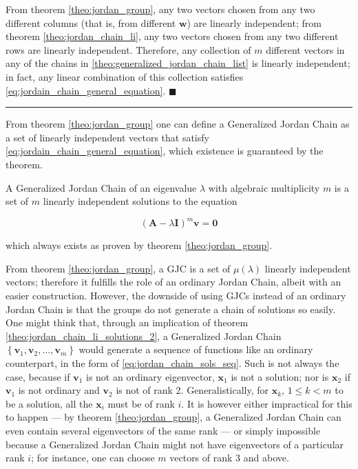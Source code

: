 	From theorem \ref{theo:jordan_group}, any two vectors chosen from any two different columns (that is, from different $\mathbf{w}$) are linearly independent; from theorem \ref{theo:jordan_chain_li}, any two vectors chosen from any two different rows are linearly independent. Therefore, any collection of $m$ different vectors in any of the chains in \eqref{theo:generalized_jordan_chain_list} is linearly independent; in fact, any linear combination of this collection satisfies \eqref{eq:jordain_chain_general_equation}.
\hfill$\blacksquare$
\vspace{5mm}
\hrule
\vspace{5mm} %

	From theorem \ref{theo:jordan_group} one can define a Generalized Jordan Chain as a set of linearly independent vectors that satisfy \eqref{eq:jordain_chain_general_equation}, which existence is guaranteed by the theorem.

\begin{definition}\label{def:jordan_group} %
	A Generalized Jordan Chain of an eigenvalue $\lambda$ with algebraic multiplicity $m$ is a set of $m$ linearly independent solutions to the equation

\begin{equation} \left(\mathbf{A} - \lambda\mathbf{I}\right)^m\mathbf{v} = \mathbf{0} \end{equation}

	\noindent which always exists as proven by theorem \ref{theo:jordan_group}.
\end{definition} %

	From theorem \ref{theo:jordan_group}, a GJC is a set of $\mu\left(\lambda\right)$ linearly independent vectors; therefore it fulfills the role of an ordinary Jordan Chain, albeit with an easier construction. However, the downside of using GJCs instead of an ordinary Jordan Chain is that the groups do not generate a chain of solutions so easily. One might think that, through an implication of theorem \ref{theo:jordan_chain_li_solutions_2}, a Generalized Jordan Chain $\left\{\mathbf{v}_1,\mathbf{v}_2,...,\mathbf{v}_m\right\}$ would generate a sequence of functions like an ordinary counterpart, in the form of \eqref{eq:jordan_chain_sols_seq}. Such is not always the case, because if $\mathbf{v}_1$ is not an ordinary eigenvector, $\mathbf{x}_1$ is not a solution; nor is $\mathbf{x}_2$ if $\mathbf{v}_1$ is not ordinary and $\mathbf{v}_2$ is not of rank 2. Generalistically, for $\mathbf{x}_k$, $1\leq k < m$ to be a solution, all the $\mathbf{x}_i$ must be of rank $i$. It is however either impractical for this to happen — by theorem \ref{theo:jordan_group}, a Generalized Jordan Chain can even contain several eigenvectors of the same rank — or simply impossible because a Generalized Jordan Chain might not have eigenvectors of a particular rank $i$; for instance, one can choose $m$ vectors of rank $3$ and above.

